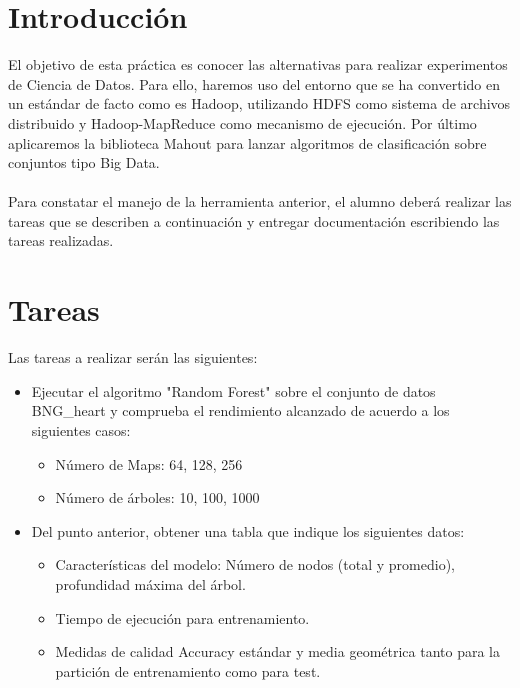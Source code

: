 \newpage %

\tableofcontents %


\newpage


\section{Introducción}

El objetivo de esta práctica es conocer las alternativas para realizar experimentos de Ciencia de Datos. Para ello, haremos uso del entorno que se ha convertido en un estándar de facto como es Hadoop, utilizando HDFS como sistema de archivos distribuido y Hadoop-MapReduce como mecanismo de ejecución. Por último aplicaremos la biblioteca Mahout para lanzar algoritmos de clasificación sobre conjuntos tipo Big Data.
\\ \\
Para constatar el manejo de la herramienta anterior, el alumno deberá realizar las tareas que se describen a continuación y entregar documentación escribiendo las tareas realizadas.

\section{Tareas}

Las tareas a realizar serán las siguientes:

\begin{itemize}
	\item Ejecutar el algoritmo "Random Forest" sobre el conjunto de datos BNG\_heart y comprueba el rendimiento alcanzado de acuerdo a los siguientes casos:
	\begin{itemize}
		\item Número de Maps: 64, 128, 256
		\item Número de árboles: 10, 100, 1000
	\end{itemize}
	\item Del punto anterior, obtener una tabla que indique los siguientes datos:
	\begin{itemize}
		\item Características del modelo: Número de nodos (total y promedio), profundidad máxima del árbol.
		\item Tiempo de ejecución para entrenamiento.
		\item Medidas de calidad Accuracy estándar y media geométrica tanto para la partición de entrenamiento como para test.
	\end{itemize}
\end{itemize}

